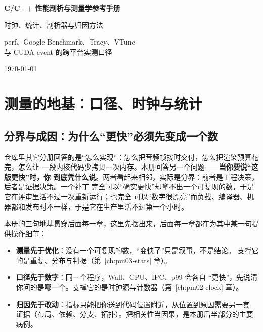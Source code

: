 \documentclass[12pt,a4paper,fontset=fandol]{ctexbook}
\newcommand{\Lang}[1]{\textsf{#1}}
\newcommand{\MWall}{\Lang{Wall}}
\newcommand{\MCpu}{\Lang{CPU}}
\newcommand{\Mx}[1]{\textsf{#1}}
\begin{document}
\frontmatter

\begin{titlepage}
\centering
\vspace*{4cm}
{\Huge\bfseries C/C++ 性能剖析与测量学参考手册\par}
\vspace{1cm}
{\LARGE 时钟、统计、剖析器与归因方法\par}
\vspace{0.4cm}
{\Large perf、Google Benchmark、Tracy、VTune \\ 与 CUDA event 的跨平台实测口径\par}
\vfill
{\large \today\par}
\end{titlepage}

\tableofcontents

\mainmatter

\cleardoublepage

\part{测量的地基：口径、时钟与统计}

\chapter{分界与成因：为什么``更快''必须先变成一个数}
\label{ch:pm01-why}

仓库里其它分册回答的是``怎么实现''：怎么把音频帧按时交付，怎么把渲染预算花完，怎么让
一段内核代码少拷贝一次内存。本册回答另一个问题——\textbf{当你要说``这版更快''时，你
到底凭什么说}。两者看起来相邻，实际是分界：前者是工程决策，后者是证据决策。一个补丁
完全可以``确实更快''却拿不出一个可复现的数，于是它在评审里活不过一次重新运行；也完全
可以``数字很漂亮''而负载、编译器、机器都和发布时不一样，于是它在生产里活不过第一个小时。

本册的三句地基贯穿后面每一章，这里先摆出来，后面每一章都在为其中某一句提供操作细节：
\begin{itemize}
  \item \textbf{测量先于优化}：没有一个可复现的数，``变快了''只是叙事，不是结论。
    支撑它的是重复、分布与判据（第~\ref{ch:pm03-stats} 章）。
  \item \textbf{口径先于数字}：同一个程序，\MWall、\MCpu、\Mx{IPC}、\Mx{p99} 会各自
    ``更快''，先说清你问的是哪一个。支撑它的是时钟源与计数器（第~\ref{ch:pm02-clock} 章）。
  \item \textbf{归因先于改动}：指标只能把你送到代码位置附近，从位置到原因需要另一套
    证据（布局、依赖、分支、拓扑）。把相关性当因果，是本册后半部分的主要病例。
\end{itemize}
\end{document}
